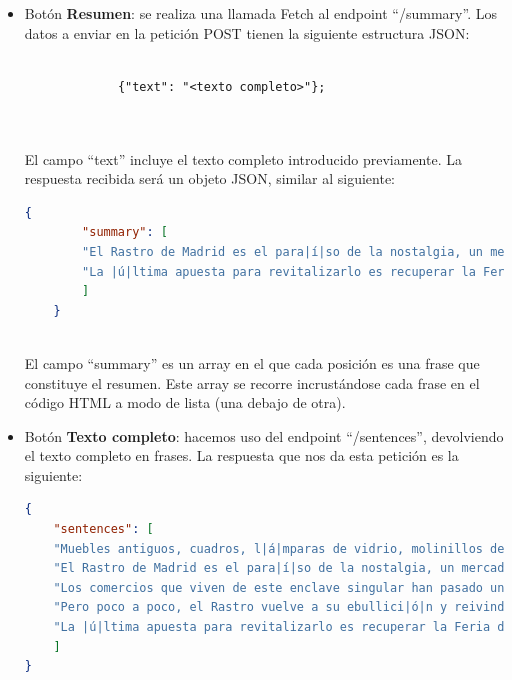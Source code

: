 \begin{itemize}
	\item Botón \textbf{Resumen}: se realiza una llamada Fetch al endpoint ``/summary''. Los datos a enviar en la petición POST  tienen la siguiente estructura JSON:
		\begin{lstlisting}
		
	         {"text": "<texto completo>"};
	
		
	\end{lstlisting}
	El campo ``text'' incluye el texto completo introducido previamente. La respuesta recibida será un objeto JSON, similar al siguiente:

	
		\begin{lstlisting}[language=json, firstnumber=1]
	{
		"summary": [
		"El Rastro de Madrid es el para|í|so de la nostalgia, un mercadillo |ú|nico que la pandemia ha puesto en la cuerda floja.",
		"La |ú|ltima apuesta para revitalizarlo es recuperar la Feria de desembalajes en la plaza del General Vara de Rey, una tradici|ó|n que tuvo su origen en los a|ñ|os 70, y que ahora se asienta el primer y el tercer s|á|bado del mes para dinamizar las ventas y que no se encasillen en los cl|á|sicos domingos."
		]
	}
		
	\end{lstlisting}
	El campo ``summary'' es un array en el que cada posición es una frase que constituye el resumen. Este array se recorre incrustándose cada frase en el código HTML a modo de lista (una debajo de otra). 
	
 
	\item Botón \textbf{Texto completo}: hacemos uso del endpoint ``/sentences'', devolviendo el texto completo en frases. La respuesta que nos da esta petición es la siguiente:
		\begin{lstlisting}[language=json, firstnumber=1]
{
	"sentences": [
	"Muebles antiguos, cuadros, l|á|mparas de vidrio, molinillos de caf|é|, porcelanas, vasijas, bustos y todo tipo de cachivaches.",
	"El Rastro de Madrid es el para|í|so de la nostalgia, un mercadillo |ú|nico que la pandemia ha puesto en la cuerda floja.",
	"Los comercios que viven de este enclave singular han pasado un a|ñ|o dif|í|cil, con bajos ingresos y muchas restricciones.",
	"Pero poco a poco, el Rastro vuelve a su ebullici|ó|n y reivindica la calle como un lugar de encuentro e intercambio.",
	"La |ú|ltima apuesta para revitalizarlo es recuperar la Feria de desembalajes en la plaza del General Vara de Rey, una tradici|ó|n que tuvo su origen en los a|ñ|os 70, y que ahora se asienta el primer y el tercer s|á|bado del mes para dinamizar las ventas y que no se encasillen en los cl|á|sicos domingos."
	]
}	
		\end{lstlisting}


\end{itemize}
